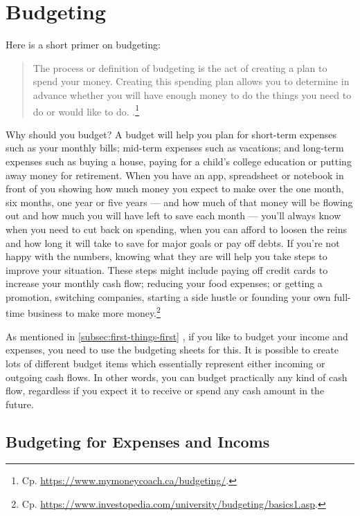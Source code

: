 \section{Budgeting}
\label{section:Budgeting}

Here is a short primer on budgeting:
\begin{quote}\small
	The process or definition of budgeting is the act of creating a plan to spend your money.
	Creating this spending plan allows you to determine in advance whether you will have enough money to do the things you need to do or would like to do. .\footnote{Cp. \url{https://www.mymoneycoach.ca/budgeting/}.}
\end{quote}

Why should you budget? A budget will help you plan for short-term expenses such as your monthly bills; mid-term expenses such as vacations; and long-term expenses such as buying a house, paying for a child’s college education or putting away money for retirement.
When you have an app, spreadsheet or notebook in front of you showing how much money you expect to make over the one month, six months, one year or five years — and how much of that money will be flowing out and how much you will have left to save each month — you’ll always know when you need to cut back on spending, when you can afford to loosen the reins and how long it will take to save for major goals or pay off debts.
If you’re not happy with the numbers, knowing what they are will help you take steps to improve your situation.
These steps might include paying off credit cards to increase your monthly cash flow; reducing your food expenses; or getting a promotion, switching companies, starting a side hustle or founding your own full-time business to make more money.\footnote{Cp. \url{https://www.investopedia.com/university/budgeting/basics1.asp}.}

As mentioned in \autoref{subsec:first-things-first} , if you like to budget your income and expenses, you need to use the budgeting sheets for this.
It is possible to create lots of different budget items which essentially represent either incoming or outgoing cash flows.
In other words, you can budget practically any kind of cash flow, regardless if you expect it to receive or spend any cash amount in the future.

\subsection{Budgeting for Expenses and Incoms}
\label{subsec:budgeting-expenses}


